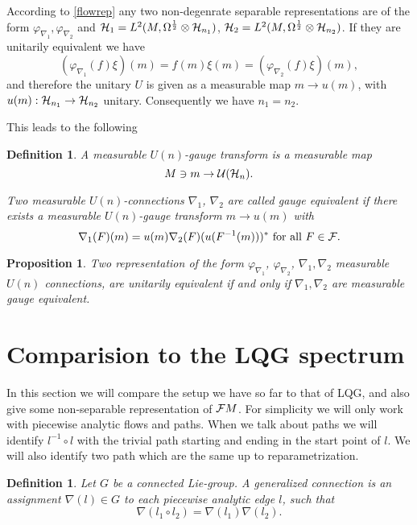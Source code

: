 \documentclass[12pt]{article}
\def\cf{{\cal F}}
\def\ch{{\cal H}}
\def\cu{{\cal U}}
\newtheorem{prop}[thm]{Proposition}
\newtheorem{definition}[thm]{Definition}
\newcommand{\cF}{{\cal F}}
\begin{document}
According to \ref{flowrep} any two non-degenrate separable representations are of the form $\varphi_{\nabla_1}, \varphi_{\nabla_2}$ and  $\ch_1=L^2(M,\Omega^{\frac12}\otimes \ch_{n_1} )$, $\ch_2=L^2(M,\Omega^{\frac12}\otimes \ch_{n_2} )$. 
If they are unitarily equivalent we have 
$$(\varphi_{\nabla_1} (f)\xi )(m)=f(m)\xi (m)=(\varphi_{\nabla_2} (f)\xi )(m), $$
and therefore  the unitary $U$ is given as a measurable map $m\to u(m)$, with $u(m):\ch_{n_1} \to \ch_{n_2}$ unitary. Consequently we have $n_1=n_2$. 

This leads to the following
\begin{definition}
A measurable $U(n)$-gauge transform is a measurable map
$$ M\ni m \to \cu (\ch_n )  .$$

Two measurable $U(n)$-connections $\nabla_1$, $\nabla_2$ are called gauge equivalent if there exists a measurable $U(n)$-gauge transform $m\to u(m)$ with   
$$ \nabla_1(F)(m)=u(m) \nabla_2(F)(u(F^{-1}(m)))^*\hbox{ for all }F\in \cF .    $$
\end{definition}

\begin{prop}
Two representation of the form $\varphi_{\nabla_1}$, $\varphi_{\nabla_2}$, $\nabla_1 , \nabla_2$ measurable $U(n)$ connections, are unitarily equivalent if and only if $\nabla_1 , \nabla_2$ are measurable gauge equivalent.
\end{prop}




\section{Comparision to  the {{LQG}} spectrum}
In this section we will compare the setup we have so far to that of LQG, and also give some   non-separable representation of $\cf M$. For simplicity we will only work with piecewise analytic flows and paths. When we talk about paths we will identify $l^{-1} \circ l$ with the trivial path starting and ending in the start point of $l$. We will also identify two path which are the same up to reparametrization. 

\begin{definition}
Let $G$ be a connected Lie-group. A generalized connection is an assignment $\nabla (l)\in G$ to each piecewise analytic edge $l$, such that 
$$\nabla (l_1 \circ l_2 )=\nabla (l_1) \nabla (l_2) .$$


\end{definition}
\end{document}
